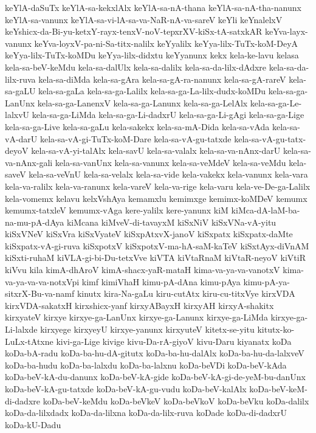 {keYlA-daSuTx
keYlA-sa-kekxlAlx
keYlA-sa-nA-thana
keYlA-sa-nA-tha-nanunx
keYlA-sa-vanunx
keYlA-sa-vi-lA-sa-va-NaR-nA-va-sareV
keYli
keYnalelxV
keYshicx-da-Bi-yu-ketxY-rayx-tenxV-noV-tepxrXV-kiSx-tA-satxkAR
keYva-layx-vanunx
keYva-loyxV-pa-ni-Sa-titx-nalilx
keYyalilx
keYya-lilx-TuTx-koM-DeyA
keYya-lilx-TuTx-koMDu
keYya-lilx-didxtu
keYyanunx
kekx
kela-ke-lavu
kelasa
kela-sa-beV-keMdu
kela-sa-dalUlx
kela-sa-dalilx
kela-sa-da-lilx-dAdxre
kela-sa-da-lilx-ruva
kela-sa-diMda
kela-sa-gAra
kela-sa-gA-ra-nanunx
kela-sa-gA-rareV
kela-sa-gaLU
kela-sa-gaLa
kela-sa-ga-Lalilx
kela-sa-ga-La-lilx-dudx-koMDu
kela-sa-ga-LanUnx
kela-sa-ga-LanenxV
kela-sa-ga-Lanunx
kela-sa-ga-LelAlx
kela-sa-ga-Le-lalxvU
kela-sa-ga-LiMda
kela-sa-ga-Li-dadxrU
kela-sa-ga-Li-gAgi
kela-sa-ga-Lige
kela-sa-ga-Live
kela-sa-gaLu
kela-sakekx
kela-sa-mA-Dida
kela-sa-vAda
kela-sa-vA-darU
kela-sa-vA-gi-TuTx-koM-Dare
kela-sa-vA-gu-tatxde
kela-sa-vA-gu-tatx-deyoV
kela-sa-vA-yi-talAlx
kela-savU
kela-sa-valalx
kela-sa-va-nAnx-darU
kela-sa-va-nAnx-gali
kela-sa-vanUnx
kela-sa-vanunx
kela-sa-veMdeV
kela-sa-veMdu
kela-saveV
kela-sa-veVnU
kela-sa-velalx
kela-sa-vide
kela-vakekx
kela-vanunx
kela-vara
kela-va-ralilx
kela-va-ranunx
kela-vareV
kela-va-rige
kela-varu
kela-ve-De-ga-Lalilx
kela-vomemx
kelavu
kelxVshAya
kemamxlu
kemimxge
kemimx-koMDeV
kemumx
kemumx-tatxleV
kemumx-vAga
kere-yalilx
kere-yanunx
kiM
kiMca-dA-laM-ba-na-mu-pA-dAya
kiMcana
kiMveV-di-tavayxM
kiSxNiV
kiSxVNa-vA-yitu
kiSxVNeV
kiSxVra
kiSxVyateV
kiSxpAtxvX-janoV
kiSxpatx
kiSxpatx-daMte
kiSxpatx-vA-gi-ruva
kiSxpotxV
kiSxpotxV-ma-hA-saM-kaTeV
kiSxtAyx-diVnAM
kiSxti-ruhaM
kiVLA-gi-bi-Du-tetxVve
kiVTA
kiVtaRnaM
kiVtaR-neyoV
kiVtiR
kiVvu
kila
kimA-dhAroV
kimA-shacx-yaR-mataH
kima-va-ya-va-vanotxV
kima-va-ya-va-va-notxVpi
kimf
kimiVhaH
kimu-pA-dAna
kimu-pAya
kimu-pA-ya-sitxrX-Bu-va-namf
kinutx
kira-Na-gaLu
kiru-cutAtx
kiru-cu-titxVye
kirxVDA
kirxVDA-sakatxH
kirxshicx-yanf
kirxyABayxH
kirxyAH
kirxyA-shakitx
kirxyateV
kirxye
kirxye-ga-LanUnx
kirxye-ga-Lanunx
kirxye-ga-LiMda
kirxye-ga-Li-lalxde
kirxyege
kirxyeyU
kirxye-yanunx
kirxyuteV
kitetx-se-yitu
kitutx-ko-LuLx-tAtxne
kivi-ga-Lige
kivige
kivu-Da-rA-giyoV
kivu-Daru
kiyanatx
koDa
koDa-bA-radu
koDa-ba-hu-dA-gitutx
koDa-ba-hu-dalAlx
koDa-ba-hu-da-lalxveV
koDa-ba-hudu
koDa-ba-lalxdu
koDa-ba-lalxnu
koDa-beVDi
koDa-beV-kAda
koDa-beV-kA-du-danunx
koDa-beV-kA-gide
koDa-beV-kA-gi-de-yeM-bu-danUnx
koDa-beV-kA-gu-tatxde
koDa-beV-kA-gu-vudu
koDa-beV-kalAlx
koDa-beV-keM-di-dadxre
koDa-beV-keMdu
koDa-beVkeV
koDa-beVkoV
koDa-beVku
koDa-dalilx
koDa-da-lilxdadx
koDa-da-lilxna
koDa-da-lilx-ruva
koDade
koDa-di-dadxrU
koDa-kU-Dadu
}
